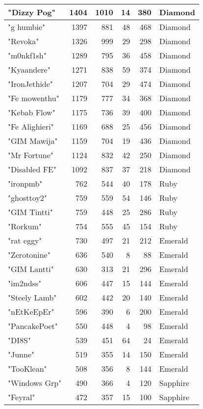 \documentclass{article}
\begin{document}
\begin{table}[htbp]
\begin{tabular}{|l|r|r|r|r|l|}
"Dizzy Pog" & 1404 & 1010 & 14 & 380 & Diamond \\ \hline
"g humbie" & 1397 & 881 & 48 & 468 & Diamond \\ \hline
"Revoka" & 1326 & 999 & 29 & 298 & Diamond \\ \hline
"m0nkf1sh" & 1289 & 795 & 36 & 458 & Diamond \\ \hline
"Kyaandere" & 1271 & 838 & 59 & 374 & Diamond \\ \hline
"IronJethide" & 1207 & 704 & 29 & 474 & Diamond \\ \hline
"Fe mowenthu" & 1179 & 777 & 34 & 368 & Diamond \\ \hline
"Kebab Flow" & 1175 & 736 & 39 & 400 & Diamond \\ \hline
"Fe Alighieri" & 1169 & 688 & 25 & 456 & Diamond \\ \hline
"GIM Mawija" & 1159 & 704 & 19 & 436 & Diamond \\ \hline
"Mr Fortune" & 1124 & 832 & 42 & 250 & Diamond \\ \hline
"Disabled FE" & 1092 & 837 & 37 & 218 & Diamond \\ \hline
"ironpmb" & 762 & 544 & 40 & 178 & Ruby \\ \hline
"ghosttoy2" & 759 & 559 & 54 & 146 & Ruby \\ \hline
"GIM Tintti" & 759 & 448 & 25 & 286 & Ruby \\ \hline
"Rorkum" & 754 & 555 & 45 & 154 & Ruby \\ \hline
"rat eggy" & 730 & 497 & 21 & 212 & Emerald \\ \hline
"Zerotonine" & 636 & 540 & 8 & 88 & Emerald \\ \hline
"GIM Lantti" & 630 & 313 & 21 & 296 & Emerald \\ \hline
"im2ndss" & 606 & 447 & 15 & 144 & Emerald \\ \hline
"Steely Lamb" & 602 & 442 & 20 & 140 & Emerald \\ \hline
"nEtKeEpEr" & 596 & 390 & 6 & 200 & Emerald \\ \hline
"PancakePoet" & 550 & 448 & 4 & 98 & Emerald \\ \hline
"DI8S" & 539 & 451 & 64 & 24 & Emerald \\ \hline
"Junne" & 519 & 355 & 14 & 150 & Emerald \\ \hline
"TooKlean" & 508 & 356 & 8 & 144 & Emerald \\ \hline
"Windows Grp" & 490 & 366 & 4 & 120 & Sapphire \\ \hline
"Feyral" & 472 & 357 & 15 & 100 & Sapphire \\ \hline

\end{tabular}
\end{table}
\end{document}
